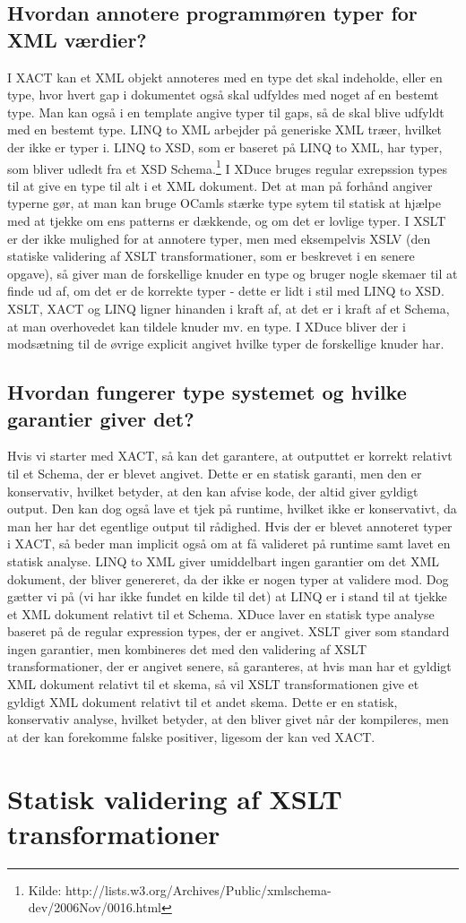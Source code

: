 \documentclass[a4paper,10pt]{article}
\begin{document}
\subsection{Hvordan annotere programmøren typer for XML værdier?}
I XACT kan et XML objekt annoteres med en type det skal indeholde, eller en type, hvor hvert gap i dokumentet også skal udfyldes med noget af en bestemt type. Man kan også i en template angive typer til gaps, så de skal blive udfyldt med en bestemt type. LINQ to XML arbejder på generiske XML træer, hvilket der ikke er typer i. LINQ to XSD, som er baseret på LINQ to XML, har typer, som bliver udledt fra et XSD Schema.\footnote{Kilde: http://lists.w3.org/Archives/Public/xmlschema-dev/2006Nov/0016.html} I XDuce bruges regular exrepssion types til at give en type til alt i et XML dokument. Det at man på forhånd angiver typerne gør, at man kan bruge OCamls stærke type sytem til statisk at hjælpe med at tjekke om ens patterns er dækkende, og om det er lovlige typer. I XSLT er der ikke mulighed for at annotere typer, men med eksempelvis XSLV (den statiske validering af XSLT transformationer, som er beskrevet i en senere opgave), så giver man de forskellige knuder en type og bruger nogle skemaer til at finde ud af, om det er de korrekte typer - dette er lidt i stil med LINQ to XSD. XSLT, XACT og LINQ ligner hinanden i kraft af, at det er i kraft af et Schema, at man overhovedet kan tildele knuder mv. en type. I XDuce bliver der i modsætning til de øvrige explicit angivet hvilke typer de forskellige knuder har.

\subsection{Hvordan fungerer type systemet og hvilke garantier giver det?}
Hvis vi starter med XACT, så kan det garantere, at outputtet er korrekt relativt til et Schema, der er blevet angivet. Dette er en statisk garanti, men den er konservativ, hvilket betyder, at den kan afvise kode, der altid giver gyldigt output. Den kan dog også lave et tjek på runtime, hvilket ikke er konservativt, da man her har det egentlige output til rådighed. Hvis der er blevet annoteret typer i XACT, så beder man implicit også om at få valideret på runtime samt lavet en statisk analyse. LINQ to XML giver umiddelbart ingen garantier om det XML dokument, der bliver genereret, da der ikke er nogen typer at validere mod. Dog gætter vi på (vi har ikke fundet en kilde til det) at LINQ er i stand til at tjekke et XML dokument relativt til et Schema. XDuce laver en statisk type analyse baseret på de regular expression types, der er angivet. XSLT giver som standard ingen garantier, men kombineres det med den validering af XSLT transformationer, der er angivet senere, så garanteres, at hvis man har et gyldigt XML dokument relativt til et skema, så vil XSLT transformationen give et gyldigt XML dokument relativt til et andet skema. Dette er en statisk, konservativ analyse, hvilket betyder, at den bliver givet når der kompileres, men at der kan forekomme falske positiver, ligesom der kan ved XACT.

\section{Statisk validering af XSLT transformationer}
\end{document}

